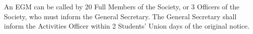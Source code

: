 \begin{clause}
  An EGM can be called by 20 Full Members of the Society, or 3 Officers of the Society, who must inform the General Secretary. The General Secretary shall inform the Activities Officer within 2 Students' Union days of the original notice.
\end{clause}
